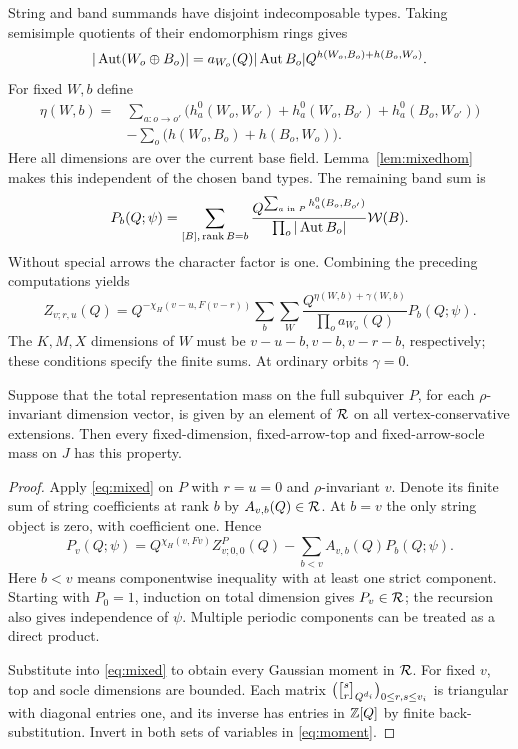 String and band summands have disjoint indecomposable types. Taking semisimple quotients of their endomorphism rings gives
\[
 |\operatorname{Aut}(W_o\oplus B_o)|=a_{W_o}(Q)|\operatorname{Aut} B_o|
 Q^{h(W_o,B_o)+h(B_o,W_o)}.
\]
For fixed $W,b$ define
\begin{align*}
 \eta(W,b)={}&\sum_{a:o\to o'}\bigl(
 h_a^0(W_o,W_{o'})+h_a^0(W_o,B_{o'})+h_a^0(B_o,W_{o'})\bigr)\\
 &-\sum_o\bigl(h(W_o,B_o)+h(B_o,W_o)\bigr).
\end{align*}
Here all dimensions are over the current base field. Lemma~\ref{lem:mixedhom} makes this independent of the chosen band types. The remaining band sum is
\[
 P_b(Q;\psi)=\sum_{[B],\,\operatorname{rank}B=b}
 \frac{Q^{\sum_{a\text{ in }P}h_a^0(B_o,B_{o'})}}{\prod_o|\operatorname{Aut} B_o|}
 \mathcal W(B).
\]
Without special arrows the character factor is one. Combining the preceding computations yields
\begin{equation}\label{eq:mixed}
 Z_{v;r,u}(Q)=Q^{-\chi_H(v-u,F(v-r))}
 \sum_b\sum_W\frac{Q^{\eta(W,b)+\gamma(W,b)}}{\prod_o a_{W_o}(Q)}
 P_b(Q;\psi).
\end{equation}
The $K,M,X$ dimensions of $W$ must be $v-u-b,v-b,v-r-b$, respectively; these conditions specify the finite sums. At ordinary orbits $\gamma=0$.

\begin{proposition}\label{prop:recovery}
Suppose that the total representation mass on the full subquiver $P$, for each $\rho$-invariant dimension vector, is given by an element of $\mathcal R$ on all vertex-conservative extensions. Then every fixed-dimension, fixed-arrow-top and fixed-arrow-socle mass on $J$ has this property.
\end{proposition}
\begin{proof}
Apply \eqref{eq:mixed} on $P$ with $r=u=0$ and $\rho$-invariant $v$. Denote its finite sum of string coefficients at rank $b$ by $A_{v,b}(Q)\in\mathcal R$. At $b=v$ the only string object is zero, with coefficient one. Hence
\begin{equation}\label{eq:bandrecursion}
 P_v(Q;\psi)=Q^{\chi_H(v,Fv)}Z^P_{v;0,0}(Q)
 -\sum_{b<v}A_{v,b}(Q)P_b(Q;\psi).
\end{equation}
Here $b<v$ means componentwise inequality with at least one strict component. Starting with $P_0=1$, induction on total dimension gives $P_v\in\mathcal R$; the recursion also gives independence of $\psi$. Multiple periodic components can be treated as a direct product.

Substitute into \eqref{eq:mixed} to obtain every Gaussian moment in $\mathcal R$. For fixed $v$, top and socle dimensions are bounded. Each matrix
$\bigl(\gauss sr{Q^{d_i}}\bigr)_{0\le r,s\le v_i}$
is triangular with diagonal entries one, and its inverse has entries in $\mathbb Z[Q]$ by finite back-substitution. Invert in both sets of variables in \eqref{eq:moment}.
\end{proof}

